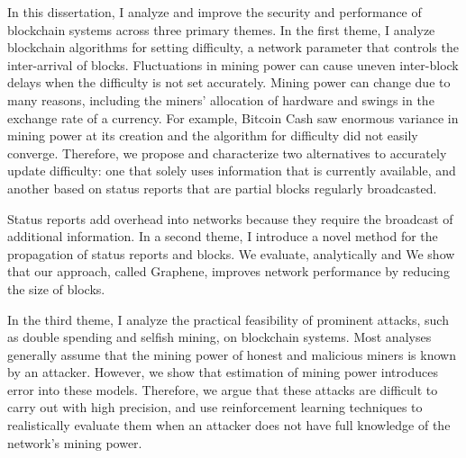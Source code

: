 
In this dissertation, I analyze and improve the security and performance of blockchain systems across three primary themes. In the first theme, I analyze blockchain algorithms for setting difficulty, a network parameter that controls the inter-arrival of blocks. Fluctuations in mining power can cause uneven inter-block delays when the difficulty is not set accurately.  Mining power can change due to many reasons, including the miners' allocation of hardware and swings in the exchange rate of a currency.  For example, Bitcoin Cash saw enormous variance in mining power at its creation and the algorithm for difficulty did not easily converge. Therefore, we propose and characterize two alternatives to accurately update difficulty: one that solely uses information that is currently available, and another based on status reports that are partial blocks regularly broadcasted.

Status reports add overhead into networks because they require the broadcast of additional information. In a second theme, I introduce a novel method for the propagation of status reports and blocks. We evaluate, analytically and We show that our approach, called Graphene, improves network performance by reducing the size of blocks.

In the third theme, I analyze the practical feasibility of prominent attacks, such as double spending and selfish mining, on blockchain systems. Most analyses generally assume that the mining power of honest and malicious miners is known by an attacker. However, we show that estimation of mining power introduces error into these models. Therefore, we argue that these attacks are difficult to carry out with high precision, and use reinforcement learning techniques to realistically evaluate them when an attacker does not have full knowledge of the network's mining power.

